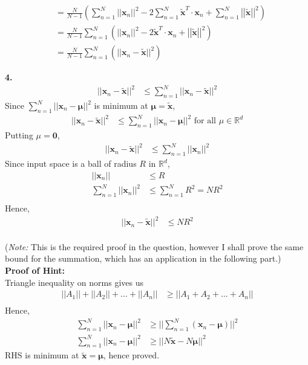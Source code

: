 \documentclass[12pt]{article}
\newcommand{\bd}[1]{\boldsymbol{#1}}
\begin{document}
\begin{align}\nonumber
    & = \frac{N}{N-1}\left(\sum_{n=1}^N  ||\bd{x}_n||^2 - 2\sum_{n=1}^N \tilde{\bd{x}}^T\cdot\bd{x}_n + \sum_{n=1}^N\left| \left| \tilde{\bd{x}} \right|\right|^2 \right)\\ \nonumber
    & = \frac{N}{N-1}\sum_{n=1}^N\left(||\bd{x}_n||^2 - 2 \tilde{\bd{x}}^T\cdot\bd{x}_n + \left| \left| \tilde{\bd{x}} \right|\right|^2 \right)\\
    & = \frac{N}{N-1}\sum_{n=1}^N\left(||\bd{x}_n-\tilde{\bd{x}} ||^2 \right)
\end{align}

\textbf{4. }
\\
\begin{align*}
    ||\bd{x}_n - \tilde{\bd{x}}||^2 & \leq \sum_{n=1}^N||\bd{x}_n - \tilde{\bd{x}}||^2
\end{align*}
Since \(\sum_{n=1}^N||\bd{x}_n - \bd\mu||^2\) is minimum at \(\bd\mu = \tilde{\bd{x}}\),
\begin{align*}
    ||\bd{x}_n - \tilde{\bd{x}}||^2 & \leq \sum_{n=1}^N||\bd{x}_n - \bd\mu||^2 \text{ for all \(\mu \in \mathbb{R}^d\)}
\end{align*}
Putting \(\mu = \bd{0}\),
\begin{align*}
    ||\bd{x}_n - \tilde{\bd{x}}||^2 & \leq \sum_{n=1}^N||\bd{x}_n||^2
\end{align*}
Since input space is a ball of radius \(R\) in \(\mathbb{R}^d\),
\begin{align*}
    ||\bd{x}_n|| & \leq R \\
    \sum_{n=1}^N||\bd{x}_n||^2 & \leq \sum_{n=1}^NR^2 = NR^2\\
\end{align*}
Hence, 
\begin{align} \nonumber
    ||\bd{x}_n - \tilde{\bd{x}}||^2 & \leq NR^2
\end{align}
\\
(\textit{Note:} This is the required proof in the question, however I shall prove the same bound for the summation, which has an application in the following part.)\\

\textbf{Proof of Hint:}\\
Triangle inequality on norms gives us
\begin{align*}
    ||A_1|| + ||A_2|| + ... + ||A_n|| & \geq  ||A_1 + A_2 + ... + A_n||\\
\end{align*}
Hence,
\begin{align*}
    \sum_{n=1}^N||\bd{x}_n - \bd\mu||^2 & \geq ||\sum_{n=1}^N(\bd{x}_n - \bd\mu)||^2 \\
    \sum_{n=1}^N||\bd{x}_n - \bd\mu||^2 & \geq ||N\tilde{\bd{x}} - N\bd\mu||^2
\end{align*}
RHS is minimum at \(\tilde{\bd{x}} = \bd\mu\), hence proved.\\
\end{document}

